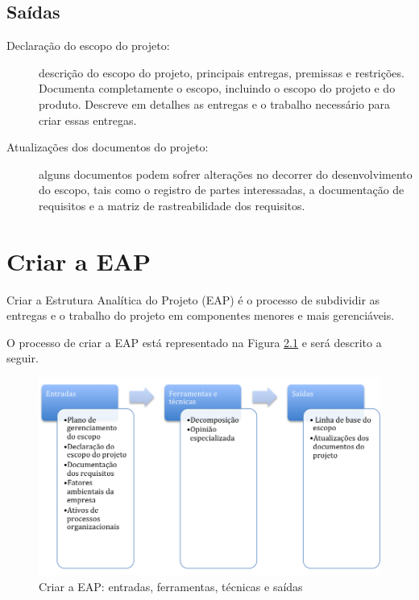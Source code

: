 \section{Saídas}

\begin{description}
	
	\item[Declaração do escopo do projeto:] descrição do escopo do projeto, principais entregas, premissas e restrições. Documenta completamente o escopo, incluindo o escopo do projeto e do produto. Descreve em detalhes as entregas e o trabalho necessário para criar essas entregas.
	
	\item[Atualizações dos documentos do projeto:] alguns documentos podem sofrer alterações no decorrer do desenvolvimento do escopo, tais como o registro de partes interessadas, a documentação de requisitos e a matriz de rastreabilidade dos requisitos.
	
\end{description}

\chapter{Criar a EAP}

Criar a Estrutura Analítica do Projeto (EAP) é o processo de subdividir as entregas e o trabalho do projeto em componentes menores e mais gerenciáveis.

O processo de criar a EAP está representado na Figura \ref{fig:escopo:eap:efts} e será descrito a seguir.

\begin{figure}[!h]
	\centering
	\includegraphics[scale=0.5]{Figuras/escopo_efts_EAP.png}
	\caption{Criar a EAP: entradas, ferramentas, técnicas e saídas}
	\label{fig:escopo:eap:efts}
\end{figure}

